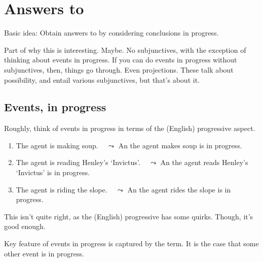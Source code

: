 \documentclass[10pt]{article}
\begin{document}
\newpage

\section{Answers to \qWhy{}}
\label{sec:answers-qwhy}

\begin{note}
  Basic idea: Obtain answers to \qWhy{} by considering conclusions in progress.
\end{note}


\begin{note}
  Part of why this is interesting.
  Maybe.
  No subjunctives, with the exception of thinking about events in progress.
  If you can do events in progress without subjunctives, then, things go through.
  Even projections.
  These talk about possibility, and entail various subjunctives, but that's about it.
\end{note}


\subsection{Events, in progress}
\label{sec:events-progress}

\begin{note}
  Roughly, think of events in progress in terms of the (English) progressive aspect.
  \begin{enumerate}
  \item
    The agent is making soup.\newline
    \mbox{ } \hfill \(\leadsto\) An  the agent makes soup is in progress.
  \item
    The agent is reading Henley's `Invictus'.\newline
    \mbox{ } \hfill \(\leadsto\) An  the agent reads Henley's `Invictus' is in progress.
  \item
    The agent is riding the slope.\newline
    \mbox{ } \hfill \(\leadsto\) An  the agent rides the slope is in progress.
  \end{enumerate}
  This isn't quite right, as the (English) progressive has some quirks.
  Though, it's good enough.
\end{note}

\begin{note}
  Key feature of events in progress is captured by the term.
  It is the case that some other event is in progress.
\end{note}
\end{document}
